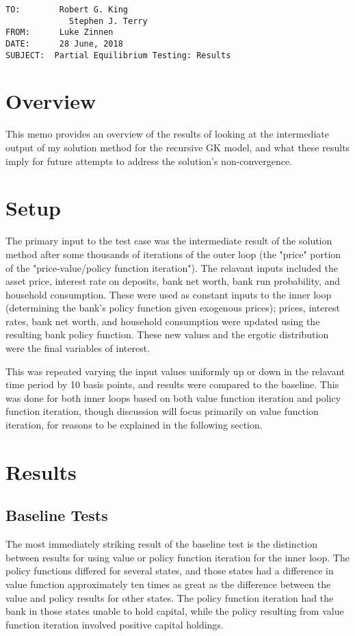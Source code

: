 \documentclass[english]{article}
\begin{document}
\begin{verbatim}
TO:        Robert G. King
             Stephen J. Terry
FROM:      Luke Zinnen
DATE:      28 June, 2018
SUBJECT:  Partial Equilibrium Testing: Results
\end{verbatim}

\section{Overview}

This memo provides an overview of the results of looking at the intermediate output of my solution method 
for the recursive GK model, and what these results imply for future attempts to address the solution's 
non-convergence.

\section{Setup}
The primary input to the test case was the intermediate result of the solution method after some 
thousands of iterations of the outer loop (the "price" portion of the "price-value/policy function 
iteration"). The relavant inputs included the asset price, interest rate on deposits, bank net worth, 
bank run probability, and household consumption. These were used as constant inputs to the inner loop 
(determining the bank's policy function given exogenous prices); prices, interest rates, bank net worth, 
and household consumption were updated using the resulting bank policy function. These new values and
the ergotic distribution were the final variables of interest.

This was repeated varying the input values uniformly up or down in the relavant time period by 10 basis points, and results 
were compared to the baseline. This was done for both inner loops based on both value function iteration 
and policy function iteration, though discussion will focus primarily on value function iteration, 
for reasons to be explained in the following section.



\section{Results}
\subsection{Baseline Tests}
The most immediately striking result of the baseline test is the distinction between results for using 
value or policy function iteration for the inner loop. The policy functions differed for several states, 
and those states had a difference in value function approximately ten times as great as the difference 
between the value and policy results for other states. The policy function iteration had the bank in 
those states unable to hold capital, while the policy resulting from value function iteration involved 
positive capital holdings. 
\end{document}
